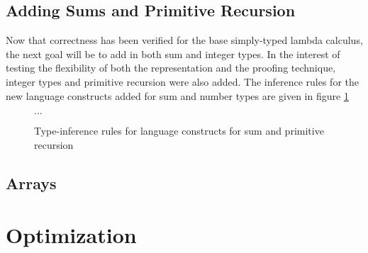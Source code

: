 \documentclass[11pt, final]{article}
\begin{document}
  \subsection{Adding Sums and Primitive Recursion}
    Now that correctness has been verified for the base simply-typed lambda calculus, the next goal will be to add in both sum and integer types.
    In the interest of testing the flexibility of both the representation and the proofing technique, integer types and primitive recursion were also added.
    The inference rules for the new language constructs added for sum and number types are given in figure \ref{fig:sum_prim_infer}

    \begin{figure}[H]
      $\dots$
      \caption{Type-inference rules for language constructs for sum and primitive recursion}
      \label{fig:sum_prim_infer}
    \end{figure}
  \subsection{Arrays}
\section{Optimization}
\end{document}
